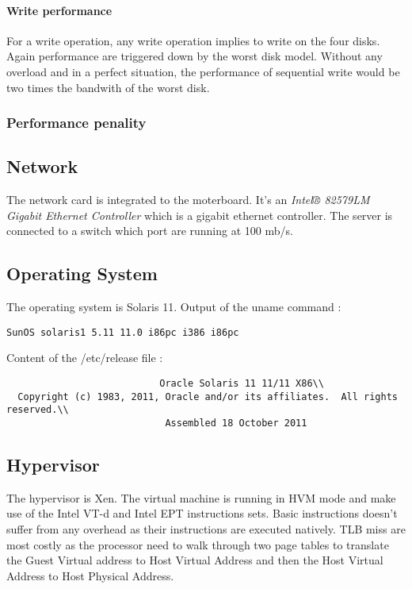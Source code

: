 \paragraph{Write performance}
For a write operation, any write operation implies to write on the four disks.
Again performance are triggered down by the worst disk model.
Without any overload and in a perfect situation, the performance of sequential
write would be two times the bandwith of the worst disk.

\subsubsection{Performance penality}

\subsection{Network}
The network card is integrated to the moterboard. It's an \emph{Intel® 82579LM Gigabit
Ethernet Controller} which is a gigabit ethernet controller.
The server is connected to a switch which port are running at 100 mb/s.

\subsection{Operating System}
The operating system is Solaris 11.
Output of the uname command :
\begin{verbatim}
SunOS solaris1 5.11 11.0 i86pc i386 i86pc
\end{verbatim}
Content of the /etc/release file :
\begin{verbatim}
                           Oracle Solaris 11 11/11 X86\\
  Copyright (c) 1983, 2011, Oracle and/or its affiliates.  All rights reserved.\\
                            Assembled 18 October 2011
\end{verbatim}

\subsection{Hypervisor}
The hypervisor is Xen.
The virtual machine is running in HVM mode and make use of the Intel VT-d and
Intel EPT instructions sets.
Basic instructions doesn't suffer from any overhead as their instructions are
executed natively.
TLB miss are most costly as the processor need to walk through two page tables
to translate the Guest Virtual address to Host Virtual Address and then the Host
Virtual Address to Host Physical Address.
